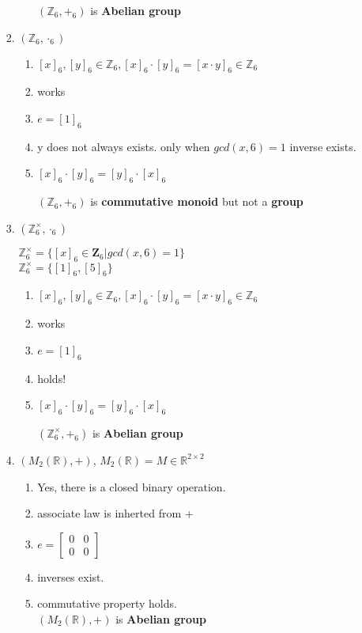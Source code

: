 \documentclass[12pt]{article}
\begin{document}
\begin{enumerate}
\begin{enumerate}
\begin{enumerate}
\begin{enumerate}
                $(\mathbb{Z}_6, +_6)$ is \textbf{Abelian group}
            \end{enumerate}
            \item  $(\mathbb{Z}_6, \cdot_6)$
            \begin{enumerate}
                \item $[x]_6,[y]_6 \in \mathbb{Z}_6, [x]_6\cdot[y]_6  = [x\cdot y]_6\in \mathbb{Z}_6$
                \item works
                \item $e = [1]_6$
                \item y does not always exists. only when $gcd(x,6) =1$ inverse exists.
                \item $[x]_6\cdot [y]_6  =[y]_6\cdot [x]_6 $
                
                $(\mathbb{Z}_6, +_6)$ is \textbf{commutative monoid} but not a \textbf{group}
            \end{enumerate}
            \item  $(\mathbb{Z}_6^{\times}, \cdot_6)$
            
            $\mathbb{Z}_6^{\times} = \{[x]_6 \in \mathbf{Z}_6 | gcd(x,6) = 1 \}$\\
            $\mathbb{Z}_6^{\times} = \{[1]_6, [5]_6 \}$
            \begin{enumerate}
                \item $[x]_6,[y]_6 \in \mathbb{Z}_6, [x]_6\cdot[y]_6  = [x\cdot y]_6\in \mathbb{Z}_6$
                \item works
                \item $e = [1]_6$
                \item holds!
                \item $[x]_6\cdot [y]_6  =[y]_6\cdot [x]_6 $
                
                $(\mathbb{Z}_6^{\times}, +_6)$ is \textbf{Abelian group}
            \end{enumerate}

            \item $(M_2(\mathbb{R}),+)$, $M_2(\mathbb{R}) = M \in \mathbb{R}^{2\times 2}$
            \begin{enumerate}
                \item Yes, there is a closed binary operation.
                \item associate law is inherted from +
                \item $e = \begin{bmatrix}
                    0 & 0 \\ 0 & 0
                \end{bmatrix}$
                \item inverses exist.
                \item commutative property holds.\\
                $(M_2(\mathbb{R}),+)$ is \textbf{Abelian group}
            \end{enumerate}


\end{enumerate}
\end{enumerate}
\end{enumerate}
\end{document}
